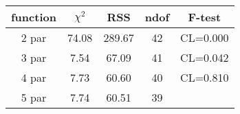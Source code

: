 \begin{tabular}{c|c|c|c|c}
function & $\chi^2$ & RSS & ndof & F-test \\
\hline
2 par & 74.08 & 289.67 & 42 & CL=0.000 \\
3 par & 7.54 & 67.09 & 41 & CL=0.042 \\
4 par & 7.73 & 60.60 & 40 & CL=0.810 \\
5 par & 7.74 & 60.51 & 39 & \\
\hline
\end{tabular}